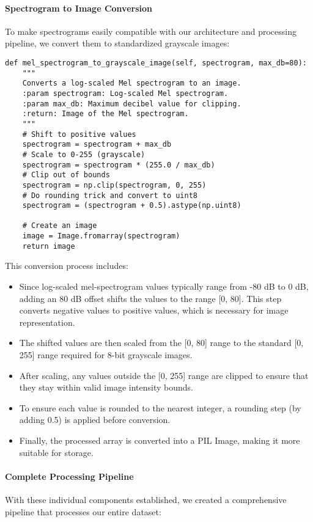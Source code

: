 \paragraph{Spectrogram to Image Conversion}
To make spectrograms easily compatible with our architecture and processing pipeline, we convert them to standardized grayscale images:

\begin{lstlisting}[caption=Converting spectrograms to grayscale images]
def mel_spectrogram_to_grayscale_image(self, spectrogram, max_db=80):
    """
    Converts a log-scaled Mel spectrogram to an image.
    :param spectrogram: Log-scaled Mel spectrogram.
    :param max_db: Maximum decibel value for clipping.
    :return: Image of the Mel spectrogram.
    """
    # Shift to positive values
    spectrogram = spectrogram + max_db
    # Scale to 0-255 (grayscale)
    spectrogram = spectrogram * (255.0 / max_db)
    # Clip out of bounds
    spectrogram = np.clip(spectrogram, 0, 255)
    # Do rounding trick and convert to uint8
    spectrogram = (spectrogram + 0.5).astype(np.uint8)
    
    # Create an image
    image = Image.fromarray(spectrogram)
    return image
\end{lstlisting}

This conversion process includes:
\begin{itemize}
    \item Since log-scaled mel-spectrogram values typically range from -80 dB to 0 dB, adding an 80 dB offset shifts the values to the range [0, 80]. This step converts negative values to positive values, which is necessary for image representation.
    \item The shifted values are then scaled from the [0, 80] range to the standard [0, 255] range required for 8-bit grayscale images.
    \item After scaling, any values outside the [0, 255] range are clipped to ensure that they stay within valid image intensity bounds.
    \item To ensure each value is rounded to the nearest integer, a rounding step (by adding 0.5) is applied before conversion.
    \item Finally, the processed array is converted into a PIL Image, making it more suitable for storage.
\end{itemize}

\paragraph{Complete Processing Pipeline}
With these individual components established, we created a comprehensive pipeline that processes our entire dataset:

